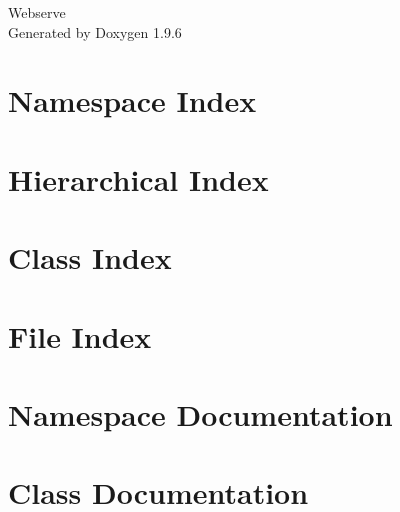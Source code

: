 \documentclass[twoside]{book}
\newcommand{\+}{\discretionary{\mbox{\scriptsize$\hookleftarrow$}}{}{}}
\newcommand{\clearemptydoublepage}{%
    \newpage{\pagestyle{empty}\cleardoublepage}%
  }
\begin{document}
  \raggedbottom
    \hypersetup{pageanchor=false,
                bookmarksnumbered=true,
                pdfencoding=unicode
               }
  \begin{titlepage}
  \vspace*{7cm}
  \begin{center}%
  {\Large Webserve}\\
  \vspace*{1cm}
  {\large Generated by Doxygen 1.9.6}\\
  \end{center}
  \end{titlepage}
  \clearemptydoublepage
  \tableofcontents
  \clearemptydoublepage
  \hypersetup{pageanchor=true}
\chapter{Namespace Index}

\chapter{Hierarchical Index}

\chapter{Class Index}

\chapter{File Index}

\chapter{Namespace Documentation}

\chapter{Class Documentation}














\end{document}
